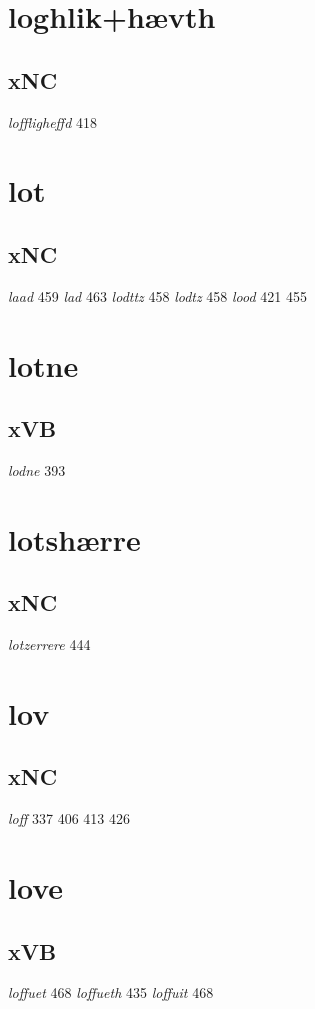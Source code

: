 \documentclass[a4paper,twocolumn]{article}
\begin{document}
\section{loghlik+hævth}
\label{sec:orgc3dba59}
\subsection{xNC}
\label{sec:orge287e0f}
\emph{loffligheffd} 418 
\section{lot}
\label{sec:orgf1056fd}
\subsection{xNC}
\label{sec:org49b0e19}
\emph{laad} 459 \emph{lad} 463 \emph{lodttz} 458 \emph{lodtz} 458 \emph{lood} 421 455 
\section{lotne}
\label{sec:orgfe7b7a7}
\subsection{xVB}
\label{sec:org721138a}
\emph{lodne} 393 
\section{lotshærre}
\label{sec:orga83c3f5}
\subsection{xNC}
\label{sec:org81f1a43}
\emph{lotzerrere} 444 
\section{lov}
\label{sec:orge6aaec6}
\subsection{xNC}
\label{sec:org7b57000}
\emph{loff} 337 406 413 426 
\section{love}
\label{sec:org529ec67}
\subsection{xVB}
\label{sec:org1d810c6}
\emph{loffuet} 468 \emph{loffueth} 435 \emph{loffuit} 468 
\end{document}
